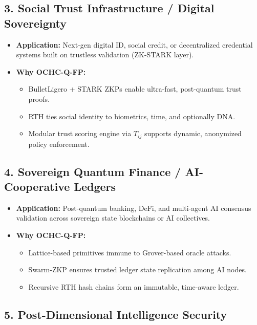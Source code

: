 \documentclass[12pt]{article}
\begin{document}
\subsection*{3. Social Trust Infrastructure / Digital Sovereignty}

\begin{itemize}
    \item \textbf{Application:} Next-gen digital ID, social credit, or decentralized credential systems built on trustless validation (ZK-STARK layer).
    \item \textbf{Why OCHC-Q-FP:}
    \begin{itemize}
        \item BulletLigero + STARK ZKPs enable ultra-fast, post-quantum trust proofs.
        \item RTH ties social identity to biometrics, time, and optionally DNA.
        \item Modular trust scoring engine via 
        \( T_{ij} \) 
        supports dynamic, anonymized policy enforcement.
    \end{itemize}
\end{itemize}

\subsection*{4. Sovereign Quantum Finance / AI-Cooperative Ledgers}

\begin{itemize}
    \item \textbf{Application:} Post-quantum banking, DeFi, and multi-agent AI consensus validation across sovereign state blockchains or AI collectives.
    \item \textbf{Why OCHC-Q-FP:}
    \begin{itemize}
        \item Lattice-based primitives immune to Grover-based oracle attacks.
        \item Swarm-ZKP ensures trusted ledger state replication among AI nodes.
        \item Recursive RTH hash chains form an immutable, time-aware ledger.
    \end{itemize}
\end{itemize}

\subsection*{5. Post-Dimensional Intelligence Security}
\end{document}
